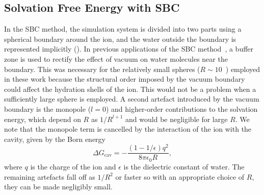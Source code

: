 \subsection{Solvation Free Energy with SBC}
In the SBC method, the simulation system is divided into two parts using a spherical boundary around 
the ion, and the water outside the boundary is represented implicitly (). In 
previous applications of the SBC method~\cite{Aqvist1990,Beglov1994}, a buffer zone is used to rectify 
the effect of vacuum on water molecules near the boundary. This was necessary for the relatively small 
spheres ($R\sim 10$~\angs) employed in these work because the structural order imposed by the vacuum 
boundary could affect the hydration shells of the ion. This would not be a problem when a sufficiently 
large sphere is employed. A second artefact introduced by the vacuum boundary is the monopole ($l=0$) 
and higher-order contributions to the solvation energy, which depend on $R$ as $1/R^{l+1}$ and would 
be negligible for large $R$. We note that the monopole term is cancelled by the interaction of the ion 
with the cavity, given by the Born energy
\begin{equation}
\Delta G_{\text{cav}} = -\frac{(1-1/\epsilon)q^2}{8\pi\epsilon_0 R},
\label{eq:born}
\end{equation}
where $q$ is the charge of the ion and $\epsilon$ is the dielectric constant of water. The remaining 
artefacts fall off as $1/R^2$ or faster so with an appropriate choice of $R$, they can be made negligibly 
small. 

